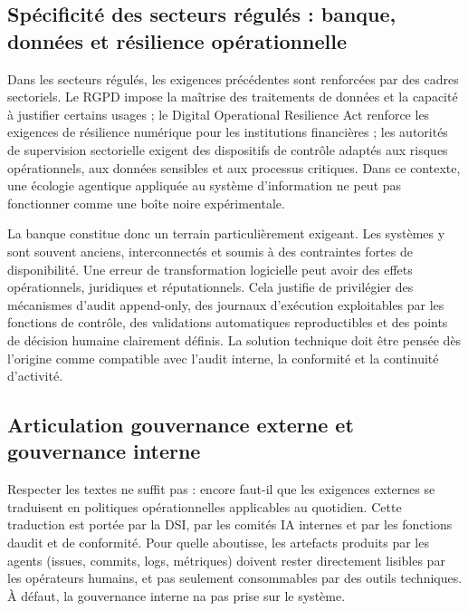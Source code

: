 \subsection{Spécificité des secteurs régulés : banque, données et résilience opérationnelle}\label{spuxe9cificituxe9-des-secteurs-ruxe9guluxe9s-banque-donnuxe9es-et-ruxe9silience-opuxe9rationnelle}

Dans les secteurs régulés, les exigences précédentes sont renforcées par des cadres sectoriels. Le RGPD impose la maîtrise des traitements de données et la capacité à justifier certains usages ; le Digital Operational Resilience Act renforce les exigences de résilience numérique pour les institutions financières ; les autorités de supervision sectorielle exigent des dispositifs de contrôle adaptés aux risques opérationnels, aux données sensibles et aux processus critiques. Dans ce contexte, une écologie agentique appliquée au système d'information ne peut pas fonctionner comme une boîte noire expérimentale.

La banque constitue donc un terrain particulièrement exigeant. Les systèmes y sont souvent anciens, interconnectés et soumis à des contraintes fortes de disponibilité. Une erreur de transformation logicielle peut avoir des effets opérationnels, juridiques et réputationnels. Cela justifie de privilégier des mécanismes d'audit append-only, des journaux d'exécution exploitables par les fonctions de contrôle, des validations automatiques reproductibles et des points de décision humaine clairement définis. La solution technique doit être pensée dès l'origine comme compatible avec l'audit interne, la conformité et la continuité d'activité.


\subsection{Articulation gouvernance externe et gouvernance interne}

Respecter les textes ne suffit pas : encore faut-il que les exigences
externes se traduisent en politiques opérationnelles applicables au
quotidien. Cette traduction est portée par la DSI, par les comités IA
internes et par les fonctions d\textquotesingle audit et de conformité.
Pour qu\textquotesingle elle aboutisse, les artefacts produits par les
agents (issues, commits, logs, métriques) doivent rester directement
lisibles par les opérateurs humains, et pas seulement consommables par
des outils techniques. À défaut, la gouvernance interne n\textquotesingle a
pas prise sur le système.

